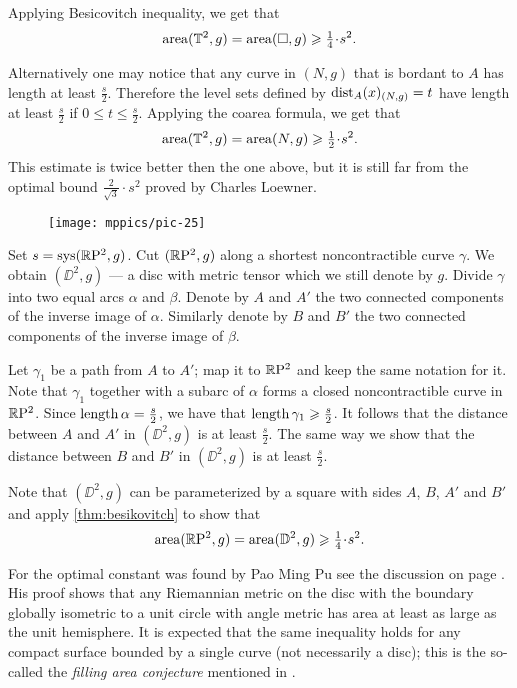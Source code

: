 Applying Besicovitch inequality, we get that 
\[\area(\TT^2,g)=\area(\square,g)\ge \tfrac14\cdot s^2.\]

Alternatively one may notice that any curve in $(N,g)$ that is bordant to $A$ has length at least $\tfrac s2$.
Therefore the level sets defined by $\mathrm{dist}_A(x)_{(N,g)}=t$ have length at least $\tfrac s2$ if $0\le t\le \tfrac s2$.
Applying the coarea formula, we get that
\[\area(\TT^2,g)=\area(N,g)\ge \tfrac12\cdot s^2.\]
This estimate is twice better then the one above, but it is still far from the optimal bound $\tfrac2{\sqrt{3}}\cdot s^2$ proved by Charles Loewner.

\begin{wrapfigure}{r}{44 mm}
\vskip-4mm
\centering
\texttt{[image: mppics/pic-25]}
\end{wrapfigure}

Set $s\z=\sys (\RP^2,g)$.
Cut $(\mathbb{R}\mathrm{P}^2,g)$ along a shortest noncontractible curve $\gamma$.
We obtain $(\DD^2,g)$ --- a disc with metric tensor which we still denote by $g$.
Divide $\gamma$ into two equal arcs $\alpha$ and $\beta$.
Denote by $A$ and $A'$ the two connected components of the inverse image of $\alpha$.
Similarly denote by $B$ and $B'$ the two connected components of the inverse image of $\beta$.

Let $\gamma_1$ be a path from $A$ to $A'$;
map it to $\mathbb{R}\mathrm{P}^2$ and keep the same notation for it.
Note that $\gamma_1$ together with a subarc of $\alpha$ forms a closed noncontractible curve in $\mathbb{R}\mathrm{P}^2$.
Since $\mathop{\rm length}\nolimits\alpha=\tfrac s2$, we have that $\mathop{\rm length}\nolimits\gamma_1\geqslant \tfrac s2$.
It follows that the distance between $A$ and $A'$ in $(\DD^2,g)$ is at least $\tfrac s2$.
The same way we show that the distance between $B$ and $B'$ in $(\DD^2,g)$ is at least $\tfrac s2$.

Note that $(\DD^2,g)$ can be parameterized by a square with sides $A$, $B$, $A'$ and $B'$ and apply \ref{thm:besikovitch} to show that 
\[\area(\RP^2,g)=\area(\DD^2,g)\ge \tfrac14\cdot s^2.\]

For the optimal constant was found by Pao Ming Pu see the discussion on page \pageref{page:pu}.
His proof shows that any Riemannian metric on the disc with the boundary globally isometric to a unit circle with angle metric has area at least as large as the unit hemisphere.
It is expected that the same inequality holds for any compact surface bounded by a single curve (not necessarily a disc);
this is the so-called the {}\emph{filling area conjecture} mentioned in \cite[5.5.B$'$(e$'$)]{gromov-1983}.

